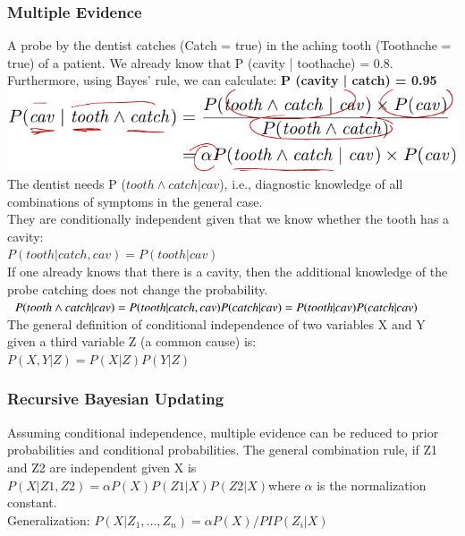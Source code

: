 \documentclass{article}
\begin{document}
\subsubsection{Multiple Evidence}
A probe by the dentist catches (Catch = true) in the aching tooth (Toothache = true) of a patient. We already know that P (cavity | toothache) = 0.8. Furthermore, using Bayes’ rule, we can calculate: \textbf{P (cavity | catch) = 0.95}\\
\includegraphics[scale=0.4]{68.png}\\
The dentist needs P ($tooth \wedge catch | cav$), i.e., diagnostic knowledge of all combinations of symptoms in the general case.\\
They are conditionally independent given that we know whether the tooth has a cavity:\\
$P(tooth|catch,cav) = P (tooth|cav)$\\
If one already knows that there is a cavity, then the additional knowledge of the probe catching does not change the probability.\\
$P (tooth \wedge catch | cav) = P (tooth | catch, cav)P (catch | cav) = \\
P (tooth | cav)P (catch | cav)$\\
The general definition of conditional independence of two variables X and Y given a third variable Z (a common cause) is:\\
$P(X,Y|Z)=P(X|Z)P(Y|Z)$\\

\subsubsection{Recursive Bayesian Updating}
Assuming conditional independence, multiple evidence can be reduced to prior probabilities and conditional probabilities. The general combination rule, if Z1 and Z2 are independent given X is $P(X | Z1 , Z2 ) = \alpha P(X)P(Z1 | X)P(Z2 | X) $where $\alpha$ is the normalization constant.\\
Generalization: $P(X|Z_1,...,Z_n)=\alpha P(X)/PI P(Z_i|X)$
\end{document}
